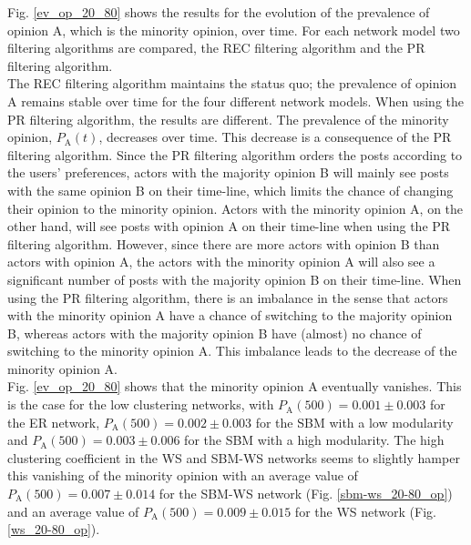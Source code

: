 \documentclass[11 pt , letterpaper , twoside , openright]{book}
\begin{document}
\newline
Fig. \ref{ev_op_20_80} shows the results for the evolution of the prevalence of opinion A, which is the minority opinion, over time. For each network model two filtering algorithms are compared, the REC filtering algorithm and the PR filtering algorithm. \\
\newline
The REC filtering algorithm maintains the status quo; the prevalence of opinion A remains stable over time for the four different network models. When using the PR filtering algorithm, the results are different. The prevalence of the minority opinion, $P_\text{A}(t)$, decreases over time. This decrease is a consequence of the PR filtering algorithm. Since the PR filtering algorithm orders the posts according to the users' preferences, actors with the majority opinion B will mainly see posts with the same opinion B on their time-line, which limits the chance of changing their opinion to the minority opinion. Actors with the minority opinion A, on the other hand, will see posts with opinion A on their time-line when using the PR filtering algorithm. However, since there are more actors with opinion B than actors with opinion A, the actors with the minority opinion A will also see a significant number of posts with the majority opinion B on their time-line. When using the PR filtering algorithm, there is an imbalance in the sense that actors with the minority opinion A have a chance of switching to the majority opinion B, whereas actors with the majority opinion B have (almost) no chance of switching to the minority opinion A. This imbalance leads to the decrease of the minority opinion A.\\
\newline
Fig. \ref{ev_op_20_80} shows that the minority opinion A eventually vanishes. This is the case for the low clustering networks, with $P_\text{A}(500) = 0.001 \pm 0.003$ for the ER network, $P_\text{A}(500) = 0.002 \pm 0.003$ for the SBM with a low modularity and $P_\text{A}(500) = 0.003 \pm 0.006$ for the SBM with a high modularity. The high clustering coefficient in the WS and SBM-WS networks seems to slightly hamper this vanishing of the minority opinion with an average value of $P_\text{A}(500) = 0.007 \pm 0.014$ for the SBM-WS network (Fig. \ref{sbm-ws_20-80_op}) and an average value of $P_\text{A}(500) = 0.009 \pm 0.015$ for the WS network (Fig. \ref{ws_20-80_op}).\\ 
\newline
\end{document}
